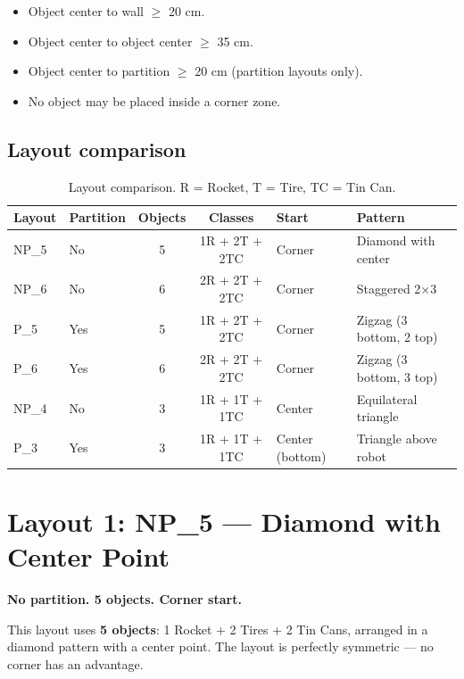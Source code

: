\documentclass[a4]{article}
\begin{document}
\begin{itemize}
    \item Object center to wall $\geq$ 20 cm.
    \item Object center to object center $\geq$ 35 cm.
    \item Object center to partition $\geq$ 20 cm (partition layouts only).
    \item No object may be placed inside a corner zone.
\end{itemize}

\subsection*{Layout comparison}

\begin{table}[H]
\centering
\begin{tabular}{llccll}
\toprule
\textbf{Layout} & \textbf{Partition} & \textbf{Objects} & \textbf{Classes} & \textbf{Start} & \textbf{Pattern} \\
\midrule
NP\_5 & No & 5 & 1R + 2T + 2TC & Corner & Diamond with center \\
NP\_6 & No & 6 & 2R + 2T + 2TC & Corner & Staggered 2$\times$3 \\
P\_5 & Yes & 5 & 1R + 2T + 2TC & Corner & Zigzag (3 bottom, 2 top) \\
P\_6 & Yes & 6 & 2R + 2T + 2TC & Corner & Zigzag (3 bottom, 3 top) \\
NP\_4 & No & 3 & 1R + 1T + 1TC & Center & Equilateral triangle \\
P\_3 & Yes & 3 & 1R + 1T + 1TC & Center (bottom) & Triangle above robot \\
\bottomrule
\end{tabular}
\caption{Layout comparison. R = Rocket, T = Tire, TC = Tin Can.}
\end{table}

\pagebreak
\section*{Layout 1: NP\_5 --- Diamond with Center Point}

\textbf{No partition. 5 objects. Corner start.}

This layout uses \textbf{5 objects}: 1 Rocket + 2 Tires + 2 Tin Cans, arranged in a diamond pattern with a center point. The layout is perfectly symmetric --- no corner has an advantage.
\end{document}
